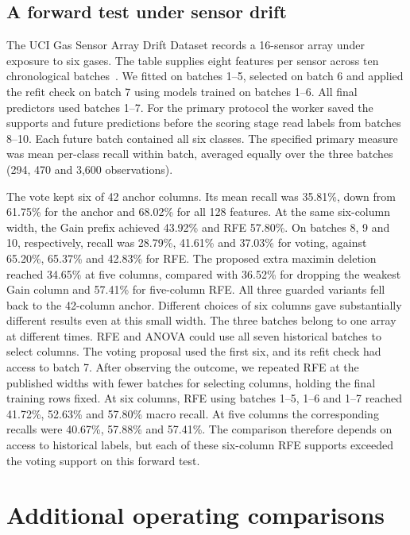 \subsection{A forward test under sensor drift}
The UCI Gas Sensor Array Drift Dataset records a 16-sensor array under exposure to six gases. The table supplies eight features per sensor across ten chronological batches~\cite{gasdriftdata}. We fitted on batches 1--5, selected on batch 6 and applied the refit check on batch 7 using models trained on batches 1--6. All final predictors used batches 1--7. For the primary protocol the worker saved the supports and future predictions before the scoring stage read labels from batches 8--10. Each future batch contained all six classes. The specified primary measure was mean per-class recall within batch, averaged equally over the three batches (294, 470 and 3,600 observations).

The vote kept six of 42 anchor columns. Its mean recall was 35.81\%, down from 61.75\% for the anchor and 68.02\% for all 128 features. At the same six-column width, the Gain prefix achieved 43.92\% and RFE 57.80\%. On batches 8, 9 and 10, respectively, recall was 28.79\%, 41.61\% and 37.03\% for voting, against 65.20\%, 65.37\% and 42.83\% for RFE. The proposed extra maximin deletion reached 34.65\% at five columns, compared with 36.52\% for dropping the weakest Gain column and 57.41\% for five-column RFE. All three guarded variants fell back to the 42-column anchor. Different choices of six columns gave substantially different results even at this small width. The three batches belong to one array at different times. RFE and ANOVA could use all seven historical batches to select columns. The voting proposal used the first six, and its refit check had access to batch 7. After observing the outcome, we repeated RFE at the published widths with fewer batches for selecting columns, holding the final training rows fixed. At six columns, RFE using batches 1--5, 1--6 and 1--7 reached 41.72\%, 52.63\% and 57.80\% macro recall. At five columns the corresponding recalls were 40.67\%, 57.88\% and 57.41\%. The comparison therefore depends on access to historical labels, but each of these six-column RFE supports exceeded the voting support on this forward test.

\section{Additional operating comparisons}
\label{sec:operating-appendix}
